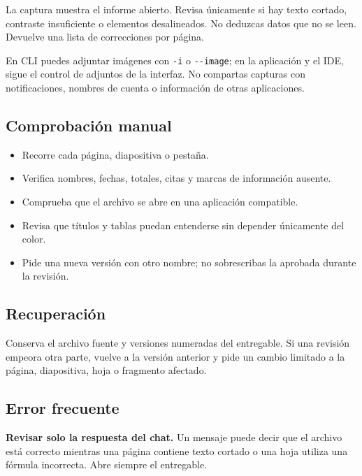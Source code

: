\documentclass[10pt,a4paper,openany]{book}
\providecommand{\tightlist}{\setlength{\itemsep}{0.18em}\setlength{\parskip}{0pt}}
\newenvironment{Shaded}{}{}
\newcommand{\NormalTok}[1]{#1}
\renewenvironment{Shaded}
  {\begin{tcolorbox}[
    enhanced,
    breakable,
    colback=CodeBg,
    colframe=Border,
    boxrule=0.5pt,
    arc=2mm,
    left=3mm,
    right=3mm,
    top=2.2mm,
    bottom=2.2mm,
    before skip=0.8em,
    after skip=0.9em
  ]}
  {\end{tcolorbox}}
\begin{document}
\begin{Shaded}
\begin{Highlighting}[]
\NormalTok{La captura muestra el informe abierto. Revisa únicamente si hay texto cortado,}
\NormalTok{contraste insuficiente o elementos desalineados. No deduzcas datos que no se leen.}
\NormalTok{Devuelve una lista de correcciones por página.}
\end{Highlighting}
\end{Shaded}

En CLI puedes adjuntar imágenes con \texttt{-i} o \texttt{-\/-image}; en
la aplicación y el IDE, sigue el control de adjuntos de la interfaz. No
compartas capturas con notificaciones, nombres de cuenta o información
de otras aplicaciones.

\subsection{Comprobación manual}\label{comprobaciuxf3n-manual-4}

\begin{itemize}
\tightlist
\item
  Recorre cada página, diapositiva o pestaña.
\item
  Verifica nombres, fechas, totales, citas y marcas de información
  ausente.
\item
  Comprueba que el archivo se abre en una aplicación compatible.
\item
  Revisa que títulos y tablas puedan entenderse sin depender únicamente
  del color.
\item
  Pide una nueva versión con otro nombre; no sobrescribas la aprobada
  durante la revisión.
\end{itemize}

\subsection{Recuperación}\label{recuperaciuxf3n-5}

Conserva el archivo fuente y versiones numeradas del entregable. Si una
revisión empeora otra parte, vuelve a la versión anterior y pide un
cambio limitado a la página, diapositiva, hoja o fragmento afectado.

\subsection{Error frecuente}\label{error-frecuente-7}

\textbf{Revisar solo la respuesta del chat.} Un mensaje puede decir que
el archivo está correcto mientras una página contiene texto cortado o
una hoja utiliza una fórmula incorrecta. Abre siempre el entregable.
\end{document}
